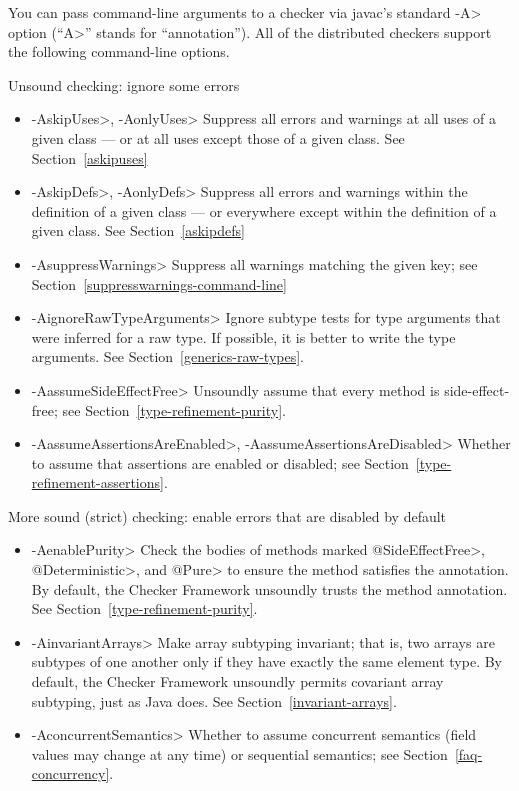 You can pass command-line arguments to a checker via javac's standard \<-A>
option (``\<A>'' stands for ``annotation'').  All of the distributed
checkers support the following command-line options.

Unsound checking: ignore some errors
\begin{itemize}
\item \<-AskipUses>, \<-AonlyUses> 
  Suppress all errors and warnings at all uses of a given class --- or at all
  uses except those of a given class.  See Section~\ref{askipuses}
\item \<-AskipDefs>, \<-AonlyDefs>
  Suppress all errors and warnings within the definition of a given class
  --- or everywhere except within the definition of a given class.  See
  Section~\ref{askipdefs}
\item \<-AsuppressWarnings>
  Suppress all warnings matching the given key; see
  Section~\ref{suppresswarnings-command-line}
\item \<-AignoreRawTypeArguments>
  Ignore subtype tests for type arguments that were inferred for a raw
  type.  If possible, it is better to write the type arguments.  See
  Section~\ref{generics-raw-types}.
\item \<-AassumeSideEffectFree>
  Unsoundly assume that every method is side-effect-free; see
  Section~\ref{type-refinement-purity}.
\item \<-AassumeAssertionsAreEnabled>, \<-AassumeAssertionsAreDisabled>
  Whether to assume that assertions are enabled or disabled; see Section~\ref{type-refinement-assertions}.
\end{itemize}

\label{unsound-by-default}
More sound (strict) checking: enable errors that are disabled by default
\begin{itemize}
\item \<-AenablePurity>
  Check the bodies of methods marked \<@SideEffectFree>, \<@Deterministic>,
  and \<@Pure> to ensure the method satisfies the annotation.  By default,
  the Checker Framework unsoundly trusts the method annotation.  See
  Section~\ref{type-refinement-purity}.
\item \<-AinvariantArrays>
  Make array subtyping invariant; that is, two arrays are subtypes of one
  another only if they have exactly the same element type.  By default,
  the Checker Framework unsoundly permits covariant array subtyping, just
  as Java does.  See Section~\ref{invariant-arrays}.
\item \<-AconcurrentSemantics>
  Whether to assume concurrent semantics (field values may change at any
  time) or sequential semantics; see Section~\ref{faq-concurrency}.
\end{itemize}

